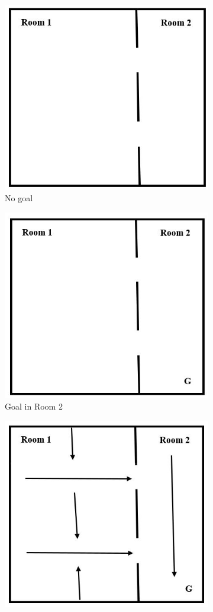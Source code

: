 \begin{figure}[ht] 
  \label{ Figure 1} 
  \begin{subfigure}[b]{0.5\linewidth}
    \centering
    \includegraphics[width=.5\linewidth]{images/img1.JPG} 
    \caption{No goal} 
    \vspace{4ex}
  \end{subfigure}%
  \begin{subfigure}[b]{0.5\linewidth}
    \centering
    \includegraphics[width=.5\linewidth]{images/img2.JPG} 
    \caption{Goal in Room 2} 
    \vspace{4ex}
  \end{subfigure} 
  \begin{subfigure}[b]{0.5\linewidth}
    \centering
    \includegraphics[width=.5\linewidth]{images/img3.JPG} 

\end{subfigure}
\end{figure}
